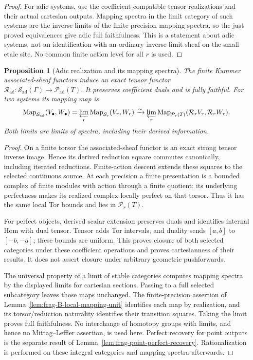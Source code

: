 \documentclass[11pt]{article}
\newtheorem{proposition}[theorem]{Proposition}
\theoremstyle{definition}
\theoremstyle{remark}
\begin{document}
\begin{proof}
For adic systems, use the coefficient-compatible tensor realizations
and their actual cartesian outputs.  Mapping spectra in the limit
category of such systems are the inverse limits of the finite
precision mapping spectra, so the just proved equivalences give
adic full faithfulness.  This is a statement about adic systems,
not an identification with an ordinary inverse-limit sheaf on the
small etale site.  No common finite action level for all $r$ is used.
\end{proof}

\begin{proposition}[Adic realization and its mapping spectra]
\label{prop:frag-local-adic-full-faithfulness}
The finite Kummer associated-sheaf functors induce an exact tensor
functor $\mathcal R_{\mathrm{ad}}:\mathcal S_{\mathrm{ad}}(\Gamma)
\to\mathcal P_{\mathrm{ad}}(T)$.  It preserves coefficient duals
and is fully faithful.  For two systems its mapping map is
\[
 \operatorname{Map}_{\mathcal S_{\mathrm{ad}}}(V_\bullet,W_\bullet)
 =\varprojlim_r\operatorname{Map}_{\mathcal S_r}(V_r,W_r)
 \xrightarrow{\sim}
 \varprojlim_r\operatorname{Map}_{\mathcal P_r(T)}(\mathcal R_rV_r,\mathcal R_rW_r).
\]
Both limits are limits of spectra, including their derived information.
\end{proposition}
\begin{proof}
On a finite torsor the associated-sheaf functor is an exact strong
tensor inverse image.  Hence its derived reduction square commutes
canonically, including iterated reductions.  Finite-action descent
extends these squares to the selected continuous source.  At each
precision a finite presentation is a bounded complex of finite
modules with action through a finite quotient; its underlying
perfectness makes its realized complex locally perfect on that
torsor.  Thus it has the same local Tor bounds and lies in
$\mathcal P_r(T)$.

For perfect objects, derived scalar extension preserves duals and
identifies internal Hom with dual tensor.  Tensor adds Tor intervals,
and duality sends $[a,b]$ to $[-b,-a]$; these bounds are uniform.
This proves closure of both selected categories under these
coefficient operations and proves cartesianness of their results.
It does not assert closure under arbitrary geometric pushforwards.

The universal property of a limit of stable categories computes
mapping spectra by the displayed limits for cartesian sections.
Passing to a full selected subcategory leaves those maps unchanged.
The finite-precision assertion of
Lemma~\ref{lem:frag-B-local-mapping-unit} identifies each map by
realization, and its torsor/reduction naturality identifies their
transition squares.  Taking the limit proves full faithfulness.
No interchange of homotopy groups with limits, and hence no
Mittag--Leffler assertion, is used here.  Perfect recovery for point
outputs is the separate result of
Lemma~\ref{lem:frag-point-perfect-recovery}.  Rationalization is
performed on these integral categories and mapping spectra afterwards.
\end{proof}
\end{document}
